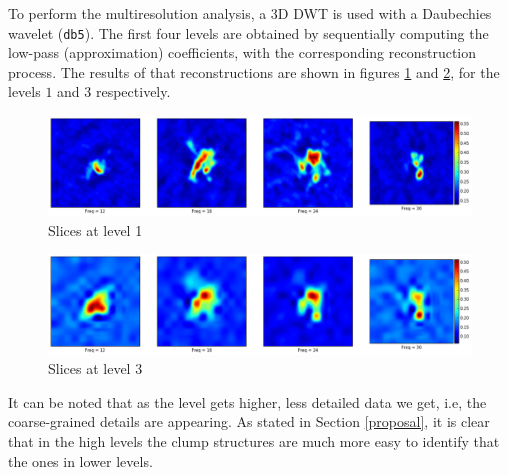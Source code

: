 \documentclass[letter, 11pt]{article}
\begin{document}
\begin{description}
    To perform the multiresolution analysis, a 3D DWT is used with a Daubechies wavelet (\texttt{db5}). The first four levels are obtained by sequentially computing the low-pass (approximation) coefficients, with the corresponding reconstruction process. The results of that reconstructions are shown in figures \ref{fig:level1} and \ref{fig:level3}, for the levels $1$ and $3$ respectively.

    \begin{figure}[htpb!]
    \centering
    \includegraphics[width=15cm]{level1}
    \caption{Slices at level 1}
    \label{fig:level1}
    \end{figure}


    \begin{figure}[htpb!]
    \centering
    \includegraphics[width=15cm]{level3}
    \caption{Slices at level 3}
    \label{fig:level3}
    \end{figure}


    It can be noted that as the level gets higher, less detailed data we get, i.e, the coarse-grained details are appearing. As stated in Section \ref{proposal}, it is clear that in the high levels the clump structures are much more easy to identify that the ones in lower levels.


\end{description}
\end{document}
